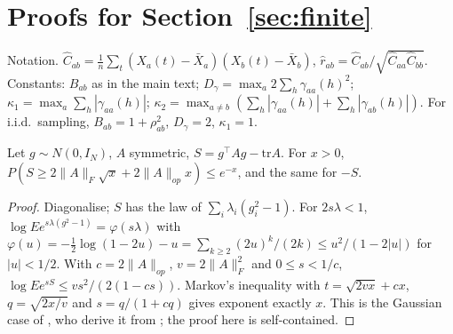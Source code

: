 \section{Proofs for Section~\ref{sec:finite}}
\label{app:finite}

Notation. $\hat C_{ab}=\frac1n\sum_t(X_a(t)-\bar X_a)(X_b(t)-\bar X_b)$,
$\hat r_{ab}=\hat C_{ab}/\sqrt{\hat C_{aa}\hat C_{bb}}$. Constants:
$B_{ab}$ as in the main text; $D_\gamma=\max_a2\sum_h\gamma_{aa}(h)^2$;
$\kappa_1=\max_a\sum_h|\gamma_{aa}(h)|$;
$\kappa_2=\max_{a\ne b}(\sum_h|\gamma_{aa}(h)|+\sum_h|\gamma_{ab}(h)|)$. For
i.i.d.\ sampling, $B_{ab}=1+\rho_{ab}^2$, $D_\gamma=2$, $\kappa_1=1$.

\begin{lemma}\label{lem:chaos}
Let $g\sim N(0,I_N)$, $A$ symmetric, $S=g^\top Ag-\mathrm{tr}A$. For $x>0$,
$P(S\ge2\|A\|_F\sqrt x+2\|A\|_{op}x)\le e^{-x}$, and the same for $-S$.
\end{lemma}
\begin{proof}
Diagonalise; $S$ has the law of $\sum_i\lambda_i(g_i^2-1)$. For $2s\lambda<1$,
$\log Ee^{s\lambda(g^2-1)}=\varphi(s\lambda)$ with
$\varphi(u)=-\frac12\log(1-2u)-u=\sum_{k\ge2}(2u)^k/(2k)\le u^2/(1-2|u|)$ for
$|u|<1/2$. With $c=2\|A\|_{op}$, $v=2\|A\|_F^2$ and $0\le s<1/c$,
$\log Ee^{sS}\le vs^2/(2(1-cs))$. Markov's inequality with $t=\sqrt{2vx}+cx$,
$q=\sqrt{2x/v}$ and $s=q/(1+cq)$ gives exponent exactly $x$. This is the
Gaussian case of \citet[Prop.~1]{hsu2012tail}, who derive it from
\citet{laurent2000adaptive}; the proof here is self-contained.
\end{proof}

